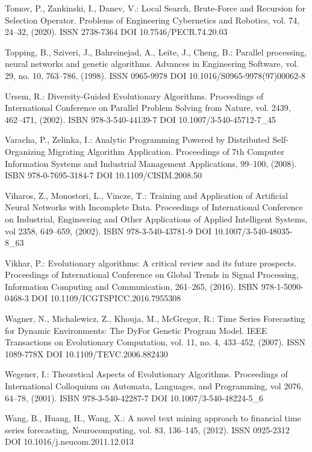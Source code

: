 \begin{thebibliography}{99.}
 Tomov, P., Zankinski, I., Danev, V.: Local Search, Brute-Force and Recursion for Selection Operator. Problems of Engineering Cybernetics and Robotics, vol. 74, 24--32, (2020). ISSN 2738-7364 DOI 10.7546/PECR.74.20.03

 Topping, B., Sziveri, J., Bahreinejad, A., Leite, J., Cheng, B.: Parallel processing, neural networks and genetic algorithms. Advances in Engineering Software, vol. 29, no. 10, 763--786, (1998). ISSN 0965-9978 DOI 10.1016/S0965-9978(97)00062-8

 Ursem, R.: Diversity-Guided Evolutionary Algorithms. Proceedings of International Conference on Parallel Problem Solving from Nature, vol. 2439, 462--471, (2002). ISBN 978-3-540-44139-7 DOI 10.1007/3-540-45712-7\_45

 Varacha, P., Zelinka, I.: Analytic Programming Powered by Distributed Self-Organizing Migrating Algorithm Application. Proceedings of 7th Computer Information Systems and Industrial Management Applications, 99--100, (2008). ISBN 978-0-7695-3184-7 DOI 10.1109/CISIM.2008.50

 Viharos, Z., Monostori, L., Vincze, T.: Training and Application of Artificial Neural Networks with Incomplete Data. Proceedings of International Conference on Industrial, Engineering and Other Applications of Applied Intelligent Systems, vol 2358, 649--659, (2002). ISBN 978-3-540-43781-9 DOI 10.1007/3-540-48035-8\_63

 Vikhar, P.: Evolutionary algorithms: A critical review and its future prospects. Proceedings of International Conference on Global Trends in Signal Processing, Information Computing and Communication, 261--265, (2016). ISBN 978-1-5090-0468-3 DOI 10.1109/ICGTSPICC.2016.7955308

 Wagner, N., Michalewicz, Z., Khouja, M., McGregor, R.: Time Series Forecasting for Dynamic Environments: The DyFor Genetic Program Model. IEEE Transactions on Evolutionary Computation, vol. 11, no. 4, 433--452, (2007). ISSN 1089-778X DOI 10.1109/TEVC.2006.882430

 Wegener, I.: Theoretical Aspects of Evolutionary Algorithms. Proceedings of International Colloquium on Automata, Languages, and Programming, vol 2076, 64--78, (2001). ISBN 978-3-540-42287-7 DOI 10.1007/3-540-48224-5\_6

 Wang, B., Huang, H., Wang, X.: A novel text mining approach to financial time series forecasting, Neurocomputing, vol. 83, 136--145, (2012). ISSN 0925-2312 DOI 10.1016/j.neucom.2011.12.013


\end{thebibliography}
